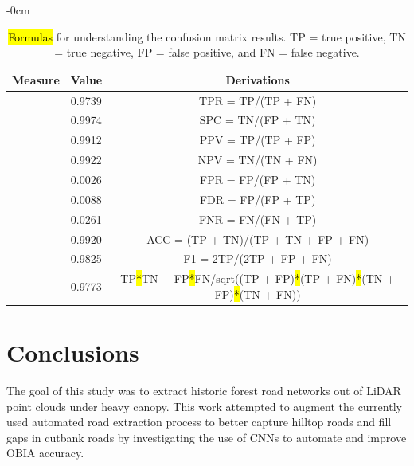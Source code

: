 \documentclass[remotesensing,article,accept,pdftex,moreauthors]{Definitions/mdpi}
\begin{document}
\vspace{-12pt}
\begin{table}[H]
\caption{\hl{Formulas} %
 for understanding the confusion matrix results. TP = true positive, TN = true negative, FP = false positive, and FN = false negative.}
\label{tab2}
\begin{adjustwidth}{-\extralength}{0cm}
		\begin{tabularx}{\fulllength}{CCc}
\toprule
 \textbf{Measure} & \textbf{Value} & \textbf{Derivations}  \\ 
\midrule
{} & 0.9739 & TPR = TP/(TP + FN) \\
\midrule
{} & 0.9974 & SPC = TN/(FP + TN)  \\
\midrule
{} & 0.9912 & PPV = TP/(TP + FP)   \\
\midrule
{} & 0.9922 & NPV = TN/(TN + FN)   \\
\midrule
{} & 0.0026 & FPR = FP/(FP + TN) \\
\midrule
{} & 0.0088 & FDR = FP/(FP + TP) \\
\midrule
{} & 0.0261 & FNR = FN/(FN + TP) \\
\midrule
{} & 0.9920 & ACC = (TP + TN)/(TP + TN + FP + FN) \\
\midrule
{} & 0.9825 & F1 = 2TP/(2TP + FP + FN) \\
\midrule
{} & 0.9773 & TP\hl{*}TN %
 $-$ FP\hl{*}FN/sqrt((TP + FP)\hl{*}(TP + FN)\hl{*}(TN + FP)\hl{*}(TN + FN)) \\
\bottomrule
\end{tabularx}
	\end{adjustwidth}
\end{table}


\section{Conclusions}

The goal of this study was to extract historic forest road networks out of LiDAR point clouds under heavy canopy. This work attempted to augment the currently used automated road extraction process to better capture hilltop roads and fill gaps in cutbank roads by investigating the use of CNNs to automate and improve OBIA accuracy.
\end{document}
